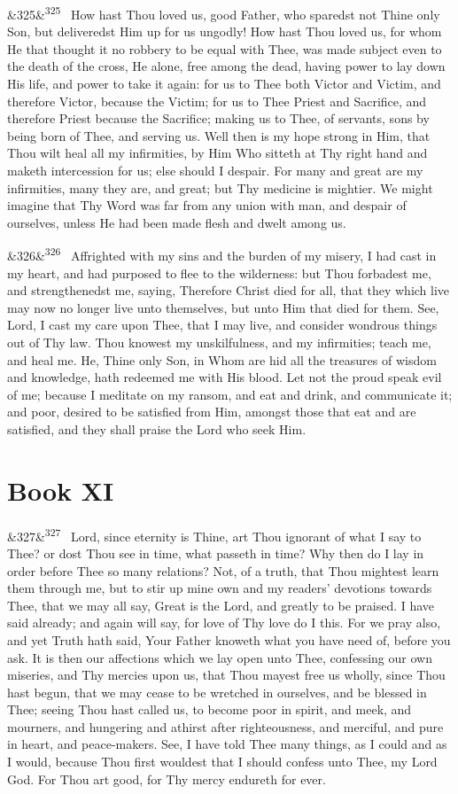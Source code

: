 \documentclass[12pt]{article}
\newcommand{\para}[1][]{\par\noindent\ifx&#1&\else\textsuperscript{\footnotesize #1}~\fi}
\begin{document}
\para[325] How hast Thou loved us, good Father, who sparedst not Thine only Son, but deliveredst Him up for us ungodly! How hast Thou loved us, for whom He that thought it no robbery to be equal with Thee, was made subject even to the death of the cross, He alone, free among the dead, having power to lay down His life, and power to take it again: for us to Thee both Victor and Victim, and therefore Victor, because the Victim; for us to Thee Priest and Sacrifice, and therefore Priest because the Sacrifice; making us to Thee, of servants, sons by being born of Thee, and serving us. Well then is my hope strong in Him, that Thou wilt heal all my infirmities, by Him Who sitteth at Thy right hand and maketh intercession for us; else should I despair. For many and great are my infirmities, many they are, and great; but Thy medicine is mightier. We might imagine that Thy Word was far from any union with man, and despair of ourselves, unless He had been made flesh and dwelt among us.

\para[326] Affrighted with my sins and the burden of my misery, I had cast in my heart, and had purposed to flee to the wilderness: but Thou forbadest me, and strengthenedst me, saying, Therefore Christ died for all, that they which live may now no longer live unto themselves, but unto Him that died for them. See, Lord, I cast my care upon Thee, that I may live, and consider wondrous things out of Thy law. Thou knowest my unskilfulness, and my infirmities; teach me, and heal me. He, Thine only Son, in Whom are hid all the treasures of wisdom and knowledge, hath redeemed me with His blood. Let not the proud speak evil of me; because I meditate on my ransom, and eat and drink, and communicate it; and poor, desired to be satisfied from Him, amongst those that eat and are satisfied, and they shall praise the Lord who seek Him.

\section*{Book XI}

\para[327] Lord, since eternity is Thine, art Thou ignorant of what I say to Thee? or dost Thou see in time, what passeth in time? Why then do I lay in order before Thee so many relations? Not, of a truth, that Thou mightest learn them through me, but to stir up mine own and my readers' devotions towards Thee, that we may all say, Great is the Lord, and greatly to be praised. I have said already; and again will say, for love of Thy love do I this. For we pray also, and yet Truth hath said, Your Father knoweth what you have need of, before you ask. It is then our affections which we lay open unto Thee, confessing our own miseries, and Thy mercies upon us, that Thou mayest free us wholly, since Thou hast begun, that we may cease to be wretched in ourselves, and be blessed in Thee; seeing Thou hast called us, to become poor in spirit, and meek, and mourners, and hungering and athirst after righteousness, and merciful, and pure in heart, and peace-makers. See, I have told Thee many things, as I could and as I would, because Thou first wouldest that I should confess unto Thee, my Lord God. For Thou art good, for Thy mercy endureth for ever.
\end{document}
